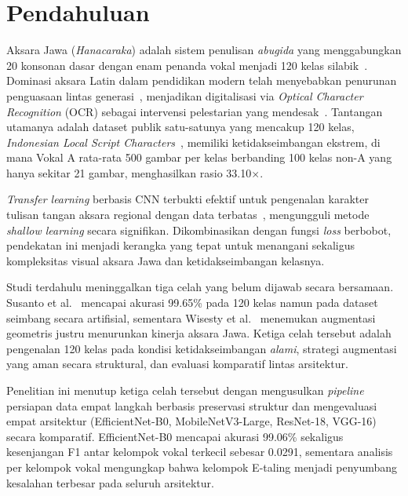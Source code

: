 \documentclass[conference]{IEEEtran}
\begin{document}
\section{Pendahuluan}

Aksara Jawa (\textit{Hanacaraka}) adalah sistem penulisan
\textit{abugida} yang menggabungkan 20 konsonan dasar dengan
enam penanda vokal menjadi 120 kelas silabik~\cite{wicaksono2024}.
Dominasi aksara Latin dalam pendidikan modern telah menyebabkan
penurunan penguasaan lintas generasi~\cite{faizin2025,wisesty2026},
menjadikan digitalisasi via \textit{Optical Character Recognition}
(OCR) sebagai intervensi pelestarian yang mendesak~\cite{widiarti2026}.
Tantangan utamanya adalah dataset publik satu-satunya yang mencakup
120 kelas, \textit{Indonesian Local Script Characters}~\cite{wisesty2026},
memiliki ketidakseimbangan ekstrem, di mana Vokal A rata-rata 500 gambar
per kelas berbanding 100 kelas non-A yang hanya sekitar 21 gambar,
menghasilkan rasio 33.10$\times$.

\textit{Transfer learning} berbasis CNN terbukti efektif untuk
pengenalan karakter tulisan tangan aksara regional dengan data
terbatas~\cite{ifriza2026,nindya2025}, mengungguli metode
\textit{shallow learning} secara signifikan.
Dikombinasikan dengan fungsi \textit{loss} berbobot, pendekatan
ini menjadi kerangka yang tepat untuk menangani sekaligus
kompleksitas visual aksara Jawa dan ketidakseimbangan kelasnya.

Studi terdahulu meninggalkan tiga celah yang belum dijawab secara
bersamaan. Susanto et al.~\cite{susantoIJAI2023} mencapai akurasi
99.65\% pada 120 kelas namun pada dataset seimbang secara
artifisial, sementara Wisesty et al.~\cite{wisesty2026} menemukan
augmentasi geometris justru menurunkan kinerja aksara Jawa.
Ketiga celah tersebut adalah pengenalan 120 kelas pada kondisi
ketidakseimbangan \textit{alami}, strategi augmentasi yang aman
secara struktural, dan evaluasi komparatif lintas arsitektur.

Penelitian ini menutup ketiga celah tersebut dengan mengusulkan
\textit{pipeline} persiapan data empat langkah berbasis preservasi
struktur dan mengevaluasi empat arsitektur (EfficientNet-B0,
MobileNetV3-Large, ResNet-18, VGG-16) secara komparatif.
EfficientNet-B0 mencapai akurasi 99.06\% sekaligus kesenjangan F1
antar kelompok vokal terkecil sebesar 0.0291, sementara analisis
per kelompok vokal mengungkap bahwa kelompok E-taling menjadi
penyumbang kesalahan terbesar pada seluruh arsitektur.
\end{document}
